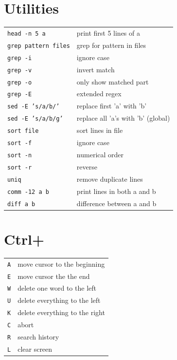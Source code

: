 \documentclass[a4paper, twocolumn]{article}
\renewcommand{\tt}{\texttt}
\begin{document}
\section{Utilities}
\begin{tabular}{ll}
    \tt{head -n 5 a}        & print first 5 lines of a              \\
    \tt{grep pattern files} & grep for pattern in files             \\
    \tt{grep -i}            & ignore case                           \\
    \tt{grep -v}            & invert match                          \\
    \tt{grep -o}            & only show matched part                \\
    \tt{grep -E}            & extended regex                        \\
    \tt{sed -E 's/a/b/'}    & replace first 'a' with 'b'            \\
    \tt{sed -E 's/a/b/g'}   & replace all 'a's with 'b' (global)    \\
    \tt{sort file}          & sort lines in file                    \\
    \tt{sort -f}            & ignore case                           \\
    \tt{sort -n}            & numerical order                       \\
    \tt{sort -r}            & reverse                               \\
    \tt{uniq}               & remove duplicate lines                \\
    \tt{comm -12 a b}       & print lines in both a and b           \\
    \tt{diff a b}           & difference between a and b
\end{tabular}

\section{Ctrl+}
\begin{tabular}{ll}
    \tt{A} & move cursor to the beginning                          \\
    \tt{E} & move cursor the the end                               \\
    \tt{W} & delete one word to the left                           \\
    \tt{U} & delete everything to the left                         \\
    \tt{K} & delete everything to the right                        \\
    \tt{C} & abort                                                 \\
    \tt{R} & search history                                        \\
    \tt{L} & clear screen
\end{tabular}
\end{document}
